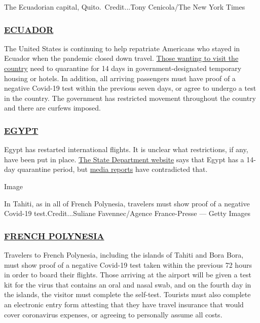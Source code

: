 The Ecuadorian capital, Quito.~Credit...Tony Cenicola/The New York Times

\hypertarget{ecuador}{%
\subsubsection{\texorpdfstring{\href{https://ec.usembassy.gov/covid-19-information-ecu-2/}{ECUADOR}}{ECUADOR}}\label{ecuador}}

The United States is continuing to help repatriate Americans who stayed
in Ecuador when the pandemic closed down travel.
\href{https://ec.usembassy.gov/covid-19-information-ecu-2/}{Those
wanting to visit the country} need to quarantine for 14 days in
government-designated temporary housing or hotels. In addition, all
arriving passengers must have proof of a negative Covid-19 test within
the previous seven days, or agree to undergo a test in the country. The
government has restricted movement throughout the country and there are
curfews imposed.

\hypertarget{egypt}{%
\subsubsection{\texorpdfstring{\href{https://eg.usembassy.gov/u-s-citizen-services/covid-19-information/}{EGYPT}}{EGYPT}}\label{egypt}}

Egypt has restarted international flights. It is unclear what
restrictions, if any, have been put in place.
\href{https://eg.usembassy.gov/u-s-citizen-services/covid-19-information/}{The
State Department website} says that Egypt has a 14-day quarantine
period, but
\href{https://www.thenational.ae/lifestyle/travel/travelling-to-egypt-during-the-coronavirus-pandemic-here-s-what-you-need-to-know-1.1042458}{media
reports} have contradicted that.

Image

In Tahiti, as in all of French Polynesia, travelers must show proof of a
negative Covid-19 test.Credit...Suliane Favennec/Agence France-Presse
--- Getty Images

\hypertarget{french-polynesia}{%
\subsubsection{\texorpdfstring{\href{https://tahititourisme.com/en-us/covid-19/}{FRENCH
POLYNESIA}}{FRENCH POLYNESIA}}\label{french-polynesia}}

Travelers to French Polynesia, including the islands of Tahiti and Bora
Bora, must show proof of a negative Covid-19 test taken within the
previous 72 hours in order to board their flights. Those arriving at the
airport will be given a test kit for the virus that contains an oral and
nasal swab, and on the fourth day in the islands, the visitor must
complete the self-test. Tourists must also complete an electronic entry
form attesting that they have travel insurance that would cover
coronavirus expenses, or agreeing to personally assume all costs.

